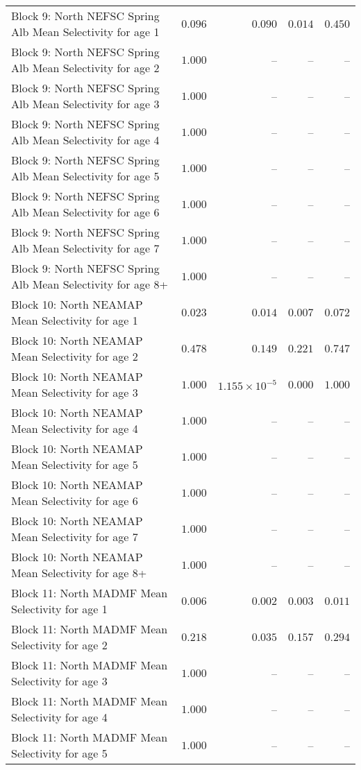 \documentclass[
]{article}
\begin{document}
\begin{landscape}
\begin{longtable}[t]{lrrrr}
Block 9: North NEFSC Spring Alb Mean Selectivity for age 1 & $0.096$ & $0.090$ & $0.014$ & $0.450$\\
Block 9: North NEFSC Spring Alb Mean Selectivity for age 2 & $1.000$ & -- & -- & --\\
Block 9: North NEFSC Spring Alb Mean Selectivity for age 3 & $1.000$ & -- & -- & --\\
Block 9: North NEFSC Spring Alb Mean Selectivity for age 4 & $1.000$ & -- & -- & --\\
\addlinespace
Block 9: North NEFSC Spring Alb Mean Selectivity for age 5 & $1.000$ & -- & -- & --\\
Block 9: North NEFSC Spring Alb Mean Selectivity for age 6 & $1.000$ & -- & -- & --\\
Block 9: North NEFSC Spring Alb Mean Selectivity for age 7 & $1.000$ & -- & -- & --\\
Block 9: North NEFSC Spring Alb Mean Selectivity for age 8+ & $1.000$ & -- & -- & --\\
Block 10: North NEAMAP Mean Selectivity for age 1 & $0.023$ & $0.014$ & $0.007$ & $0.072$\\
\addlinespace
Block 10: North NEAMAP Mean Selectivity for age 2 & $0.478$ & $0.149$ & $0.221$ & $0.747$\\
Block 10: North NEAMAP Mean Selectivity for age 3 & $1.000$ & $1.155\times 10^{-5}$ & $0.000$ & $1.000$\\
Block 10: North NEAMAP Mean Selectivity for age 4 & $1.000$ & -- & -- & --\\
Block 10: North NEAMAP Mean Selectivity for age 5 & $1.000$ & -- & -- & --\\
Block 10: North NEAMAP Mean Selectivity for age 6 & $1.000$ & -- & -- & --\\
\addlinespace
Block 10: North NEAMAP Mean Selectivity for age 7 & $1.000$ & -- & -- & --\\
Block 10: North NEAMAP Mean Selectivity for age 8+ & $1.000$ & -- & -- & --\\
Block 11: North MADMF Mean Selectivity for age 1 & $0.006$ & $0.002$ & $0.003$ & $0.011$\\
Block 11: North MADMF Mean Selectivity for age 2 & $0.218$ & $0.035$ & $0.157$ & $0.294$\\
Block 11: North MADMF Mean Selectivity for age 3 & $1.000$ & -- & -- & --\\
\addlinespace
Block 11: North MADMF Mean Selectivity for age 4 & $1.000$ & -- & -- & --\\
Block 11: North MADMF Mean Selectivity for age 5 & $1.000$ & -- & -- & --\\

\end{longtable}
\end{landscape}
\end{document}

